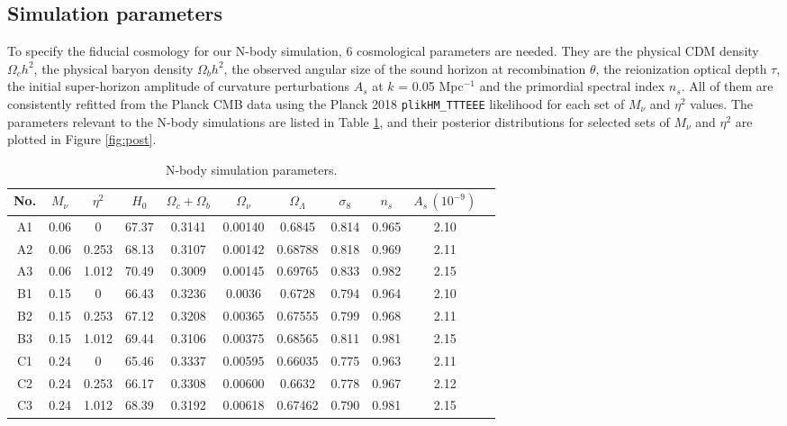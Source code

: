 \subsection{Simulation parameters}


To specify the fiducial cosmology for our N-body simulation, 6 cosmological parameters are needed. 
They are the physical CDM density $\Omega_ch^2$, the physical baryon density $\Omega_bh^2$, the observed angular size of the sound horizon at recombination $\theta$, the reionization optical depth $\tau$, 
the initial super-horizon amplitude of curvature perturbations $A_s$ at $k$ = 0.05 Mpc$^{-1}$ and the primordial spectral index $n_s$. 
All of them are consistently refitted from the Planck CMB data using the Planck 2018 \texttt{plikHM\_TTTEEE} likelihood for each set of $M_\nu$ and $\eta^2$ values. The parameters relevant to the N-body simulations are listed in Table \ref{tab:simparam}, and their posterior distributions for selected sets of $M_\nu$ and $\eta^2$ are plotted in Figure \ref{fig:post}. 


\begin{table}[!hbt]
		\begin{center}
		\begin{tabular}{|c|c|c|c|c|c|c|c|c|c|c|}
			\hline
			No. &$M_\nu$ & $\eta^2 $ & $H_0$ & $\Omega_c+\Omega_b$ & $\Omega_\nu$ &$\Omega_\Lambda$ & $\sigma_8$ & $n_s$ & $A_s \,(10^{-9})$\\
			\hline
			\hline
			A1 & 0.06 & 0 & 67.37 & 0.3141 & 0.00140 & 0.6845 & 0.814 & 0.965 & 2.10 \\
			A2 & 0.06 & 0.253 & 68.13 & 0.3107 & 0.00142 & 0.68788 & 0.818 & 0.969 & 2.11\\
			A3 & 0.06 & 1.012 & 70.49  & 0.3009 & 0.00145 & 0.69765 & 0.833 & 0.982 & 2.15 \\
			\hline
			B1 & 0.15 & 0 & 66.43 & 0.3236 & 0.0036 & 0.6728 & 0.794 & 0.964 & 2.10 \\
			B2 & 0.15 & 0.253 & 67.12 & 0.3208 & 0.00365 & 0.67555 & 0.799 & 0.968 & 2.11\\
			B3 & 0.15 & 1.012 & 69.44 & 0.3106 & 0.00375 & 0.68565 & 0.811 & 0.981 & 2.15\\
			\hline
            C1 & 0.24 & 0 & 65.46 & 0.3337 & 0.00595 & 0.66035 & 0.775 & 0.963 & 2.11\\
			C2 & 0.24 & 0.253 & 66.17 & 0.3308 & 0.00600 & 0.6632 & 0.778 & 0.967 & 2.12\\
			C3 & 0.24 & 1.012 & 68.39 & 0.3192 & 0.00618 & 0.67462 & 0.790 & 0.981 & 2.15\\
			\hline
		\end{tabular}
		\caption{\label{tab:simparam} N-body simulation parameters.}
		\end{center}
\end{table}


